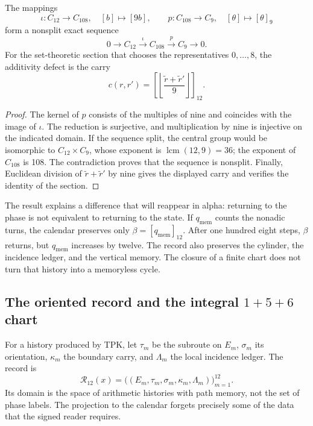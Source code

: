 \begin{proposition}
\label{prop:k-extension}
The mappings
\[
 \iota:C_{12}\longrightarrow C_{108},\quad[b]\longmapsto[9b],
 \qquad p:C_{108}\longrightarrow C_9,\quad[\theta]\longmapsto[\theta]_9
\]
form a nonsplit exact sequence
\[
 0\longrightarrow C_{12}\xrightarrow{\iota}C_{108}
 \xrightarrow{p}C_9\longrightarrow0.
\]
For the set-theoretic section that chooses the representatives
\(0,\ldots,8\), the additivity defect is the carry
\[
 c(r,r')=\left[\left\lfloor\frac{\widetilde r+\widetilde r'}9\right\rfloor\right]_{12}.
\]
\end{proposition}

\begin{proof}
The kernel of \(p\) consists of the multiples of nine and coincides with the
image of \(\iota\). The reduction is surjective, and multiplication by nine
is injective on the indicated domain. If the sequence split, the central
group would be isomorphic to \(C_{12}\times C_9\), whose exponent is
\(\operatorname{lcm}(12,9)=36\); the exponent of \(C_{108}\) is 108. The
contradiction proves that the sequence is nonsplit. Finally, Euclidean
division of \(\widetilde r+\widetilde r'\) by nine gives the displayed carry
and verifies the identity of the section.
\end{proof}

The result explains a difference that will reappear in alpha: returning to
the phase is not equivalent to returning to the state. If
\(q_{\mathrm{mem}}\) counts the nonadic turns, the calendar preserves only
\(\beta=[q_{\mathrm{mem}}]_{12}\). After one hundred eight steps,
\(\beta\) returns, but \(q_{\mathrm{mem}}\) increases by twelve. The record
also preserves the cylinder, the incidence ledger, and the vertical memory.
The closure of a finite chart does not turn that history into a memoryless
cycle.

\subsection{The oriented record and the integral \texorpdfstring{\(1+5+6\)}{1+5+6} chart}
\label{subsec:k-registro-integral}

For a history produced by TPK, let \(\tau_m\) be the subroute on
\(E_m\), \(\sigma_m\) its orientation, \(\kappa_m\) the boundary carry,
and \(\Lambda_m\) the local incidence ledger. The record is
\[
 \mathcal R_{12}(x)=
 \bigl((E_m,\tau_m,\sigma_m,\kappa_m,\Lambda_m)\bigr)_{m=1}^{12}.
\]
Its domain is the space of arithmetic histories with path memory, not the set
of phase labels. The projection to the calendar forgets precisely some of
the data that the signed reader requires.

